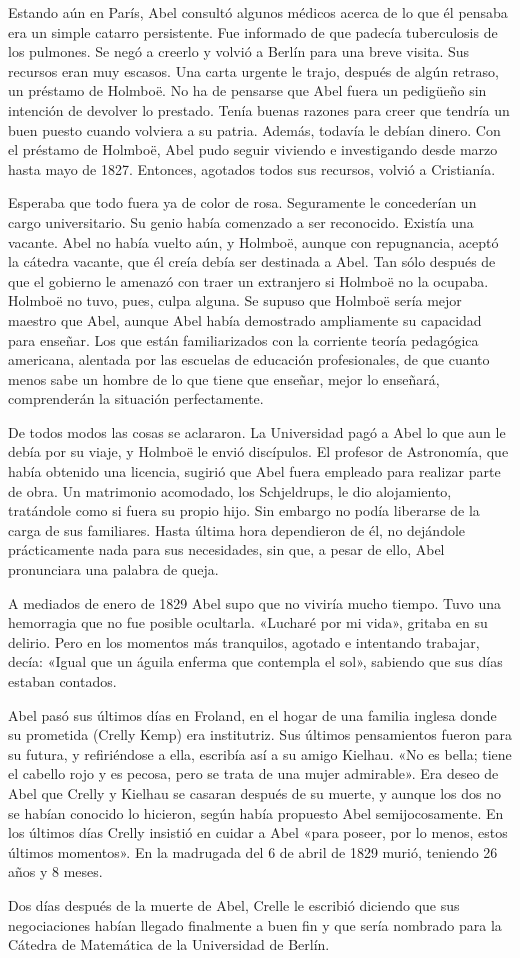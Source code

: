 \documentclass[a4paper, 12pt, draft]{article}
\begin{document}
Estando aún en París, Abel consultó algunos médicos acerca de lo que él pensaba era un simple catarro persistente. Fue informado de que padecía tuberculosis de los pulmones. Se negó a creerlo y volvió a Berlín para una breve visita. Sus recursos eran muy escasos. Una carta urgente le trajo, después de algún retraso, un préstamo de Holmboë. No ha de pensarse que Abel fuera un pedigüeño sin intención de devolver lo prestado. Tenía buenas razones para creer que tendría un buen puesto cuando volviera a su patria. Además, todavía le debían dinero. Con el préstamo de Holmboë, Abel pudo seguir viviendo e investigando desde marzo hasta mayo de 1827. Entonces, agotados todos sus recursos, volvió a Cristianía.

Esperaba que todo fuera ya de color de rosa. Seguramente le concederían un cargo universitario. Su genio había comenzado a ser reconocido. Existía una vacante. Abel no había vuelto aún, y Holmboë, aunque con repugnancia, aceptó la cátedra vacante, que él creía debía ser destinada a Abel. Tan sólo después de que el gobierno le amenazó con traer un extranjero si Holmboë no la ocupaba. Holmboë no tuvo, pues, culpa alguna. Se supuso que Holmboë sería mejor maestro que Abel, aunque Abel había demostrado ampliamente su capacidad para enseñar. Los que están familiarizados con la corriente teoría pedagógica americana, alentada por las escuelas de educación profesionales, de que cuanto menos sabe un hombre de lo que tiene que enseñar, mejor lo enseñará, comprenderán la situación perfectamente.

De todos modos las cosas se aclararon. La Universidad pagó a Abel lo que aun le debía por su viaje, y Holmboë le envió discípulos. El profesor de Astronomía, que había obtenido una licencia, sugirió que Abel fuera empleado para realizar parte de obra. Un matrimonio acomodado, los Schjeldrups, le dio alojamiento, tratándole como si fuera su propio hijo. Sin embargo no podía liberarse de la carga de sus familiares. Hasta última hora dependieron de él, no dejándole prácticamente nada para sus necesidades, sin que, a pesar de ello, Abel pronunciara una palabra de queja.

A mediados de enero de 1829 Abel supo que no viviría mucho tiempo. Tuvo una hemorragia que no fue posible ocultarla. «Lucharé por mi vida», gritaba en su delirio. Pero en los momentos más tranquilos, agotado e intentando trabajar, decía: «Igual que un águila enferma que contempla el sol», sabiendo que sus días estaban contados.

Abel pasó sus últimos días en Froland, en el hogar de una familia inglesa donde su prometida (Crelly Kemp) era institutriz. Sus últimos pensamientos fueron para su futura, y refiriéndose a ella, escribía así a su amigo Kielhau. «No es bella; tiene el cabello rojo y es pecosa, pero se trata de una mujer admirable». Era deseo de Abel que Crelly y Kielhau se casaran después de su muerte, y aunque los dos no se habían conocido lo hicieron, según había propuesto Abel semijocosamente. En los últimos días Crelly insistió en cuidar a Abel «para poseer, por lo menos, estos últimos momentos». En la madrugada del 6 de abril de 1829 murió, teniendo 26 años y 8 meses.



Dos días después de la muerte de Abel, Crelle le escribió diciendo que sus negociaciones habían llegado finalmente a buen fin y que sería nombrado para la Cátedra de Matemática de la Universidad de Berlín. 
\end{document}
